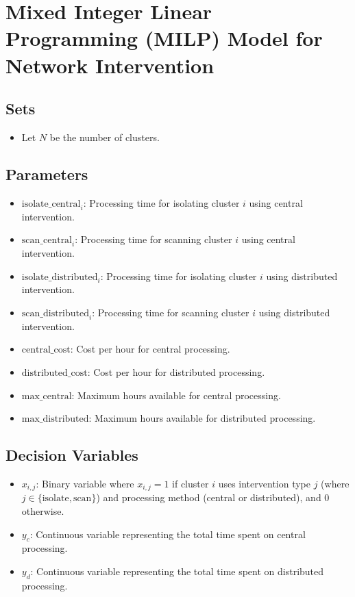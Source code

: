 \documentclass{article}
\begin{document}
\section*{Mixed Integer Linear Programming (MILP) Model for Network Intervention}

\subsection*{Sets}
\begin{itemize}
    \item Let \( N \) be the number of clusters.
    \end{itemize}

\subsection*{Parameters}
\begin{itemize}
    \item \( \text{isolate\_central}_i \): Processing time for isolating cluster \( i \) using central intervention.
    \item \( \text{scan\_central}_i \): Processing time for scanning cluster \( i \) using central intervention.
    \item \( \text{isolate\_distributed}_i \): Processing time for isolating cluster \( i \) using distributed intervention.
    \item \( \text{scan\_distributed}_i \): Processing time for scanning cluster \( i \) using distributed intervention.
    \item \( \text{central\_cost} \): Cost per hour for central processing.
    \item \( \text{distributed\_cost} \): Cost per hour for distributed processing.
    \item \( \text{max\_central} \): Maximum hours available for central processing.
    \item \( \text{max\_distributed} \): Maximum hours available for distributed processing.
\end{itemize}

\subsection*{Decision Variables}
\begin{itemize}
    \item \( x_{i,j} \): Binary variable where \( x_{i,j} = 1 \) if cluster \( i \) uses intervention type \( j \) (where \( j \in \{ \text{isolate}, \text{scan} \} \)) and processing method (central or distributed), and \( 0 \) otherwise.
    \item \( y_{c} \): Continuous variable representing the total time spent on central processing.
    \item \( y_{d} \): Continuous variable representing the total time spent on distributed processing.
\end{itemize}
\end{document}
